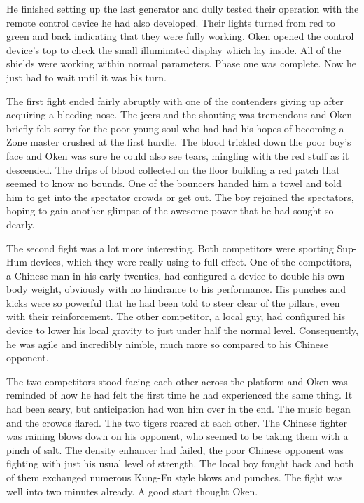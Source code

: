 He finished setting up the last generator and dully tested their operation with the remote control device he had also developed.  Their lights turned from red to green and back indicating that they were fully working.  Oken opened the control device's top to check the small illuminated display which lay inside.  All of the shields were working within normal parameters.  Phase one was complete.  Now he just had to wait until it was his turn.

The first fight ended fairly abruptly with one of the contenders giving up after acquiring a bleeding nose.  The jeers and the shouting was tremendous and Oken briefly felt sorry for the poor young soul who had had his hopes of becoming a Zone master crushed at the first hurdle.  The blood trickled down the poor boy's face and Oken was sure he could also see tears, mingling with the red stuff as it descended.  The drips of blood collected on the floor building a red patch that seemed to know no bounds.  One of the bouncers handed him a towel and told him to get into the spectator crowds or get out.  The boy rejoined the spectators, hoping to gain another glimpse of the awesome power that he had sought so dearly.  

The second fight was a lot more interesting.  Both competitors were sporting Sup-Hum devices, which they were really using to full effect.  One of the competitors, a Chinese man in his early twenties, had configured a device to double his own body weight, obviously with no hindrance to his performance.  His punches and kicks were so powerful that he had been told to steer clear of the pillars, even with their reinforcement.  The other competitor, a local guy, had configured his device to lower his local gravity to just under half the normal level.  Consequently, he was  agile and incredibly nimble, much more so compared to his Chinese opponent.

The two competitors stood facing each other across the platform and Oken was reminded of how he had felt the first time he had experienced the same thing.  It had been scary, but anticipation had won him over in the end.  The music began and the crowds flared.  The two tigers roared at each other.  The Chinese fighter was raining blows down on his opponent, who seemed to be taking them with a pinch of salt.  The density enhancer had failed, the poor Chinese opponent was fighting with just his usual level of strength.  The local boy fought back and both of them exchanged numerous Kung-Fu style blows and punches.  The fight was well into two minutes already.  A good start thought Oken.

